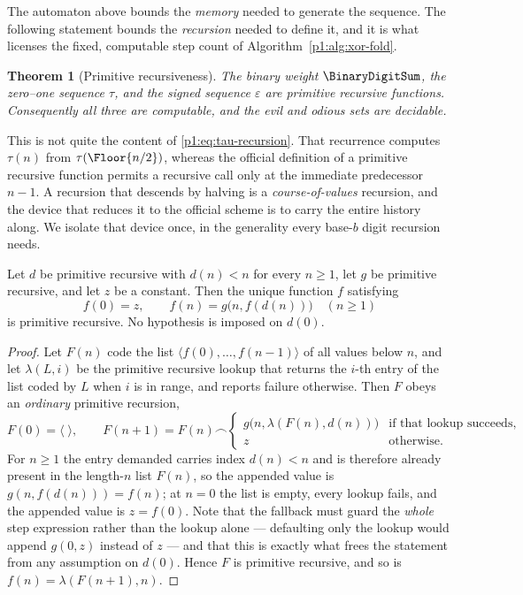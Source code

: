 \documentclass[11pt,oneside]{article}
\numberwithin{equation}{section}
\newtheorem{theorem}{Theorem}[section]
\theoremstyle{definition}
\theoremstyle{remark}
\newcommand{\eps}{\varepsilon}
\begin{document}
The automaton above bounds the \emph{memory} needed to generate the
sequence.  The following statement bounds the \emph{recursion} needed to
define it, and it is what licenses the fixed, computable step count of
Algorithm~\ref{p1:alg:xor-fold}.

\begin{theorem}[Primitive recursiveness]
\label{p1:thm:primitive-recursive}
The binary weight \(\BinaryDigitSum\), the zero--one sequence \(\tau\), and the
signed sequence \(\eps\) are primitive recursive functions.
Consequently all three are computable, and the evil and odious sets are
decidable.
\end{theorem}

This is not quite the content of \eqref{p1:eq:tau-recursion}.  That
recurrence computes \(\tau(n)\) from \(\tau(\Floor{n/2})\),
whereas the official definition of a primitive recursive function permits
a recursive call only at the immediate predecessor \(n-1\).  A recursion
that descends by halving is a \emph{course-of-values} recursion, and the
device that reduces it to the official scheme is to carry the entire
history along.  We isolate that device once, in the generality every
base-\(b\) digit recursion needs.

\begin{lemma}
\label{p1:lem:descent-recursion}
Let \(d\) be primitive recursive with \(d(n)<n\) for every
\(n\ge1\), let \(g\) be primitive recursive, and let \(z\) be a
constant.  Then the unique function \(f\) satisfying
\begin{equation}
  f(0)=z,
  \qquad
  f(n)=g\bigl(n,f(d(n))\bigr)\quad(n\ge1)
  \label{p1:eq:descent-recursion}
\end{equation}
is primitive recursive.  No hypothesis is imposed on \(d(0)\).
\end{lemma}

\begin{proof}
Let \(F(n)\) code the list \(\langle f(0),\ldots,f(n-1)\rangle\) of
all values below \(n\), and let \(\lambda(L,i)\) be the primitive
recursive lookup that returns the \(i\)-th entry of the list coded by
\(L\) when \(i\) is in range, and reports failure otherwise.  Then
\(F\) obeys an \emph{ordinary} primitive recursion,
\[
  F(0)=\langle\;\rangle,
  \qquad
  F(n+1)=F(n)\frown
  \begin{cases}
    g\bigl(n,\lambda(F(n),d(n))\bigr)
      &\text{if that lookup succeeds},\\
    z&\text{otherwise.}
  \end{cases}
\]
For \(n\ge1\) the entry demanded carries index \(d(n)<n\) and is
therefore already present in the length-\(n\) list \(F(n)\), so the
appended value is \(g(n,f(d(n)))=f(n)\); at \(n=0\) the list is empty,
every lookup fails, and the appended value is \(z=f(0)\).  Note that the
fallback must guard the \emph{whole} step expression rather than the
lookup alone --- defaulting only the lookup would append \(g(0,z)\)
instead of \(z\) --- and that this is exactly what frees the statement
from any assumption on \(d(0)\).  Hence \(F\) is primitive recursive,
and so is \(f(n)=\lambda(F(n+1),n)\).
\end{proof}
\end{document}
